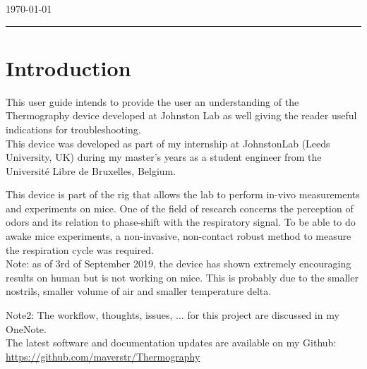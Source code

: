 \documentclass[a4paper]{article}
\begin{document}
\begin{titlepage}

{\large \today}\\[2cm] %


\vfill %

\end{titlepage}


\noindent\rule{\textwidth}{1pt}

\tableofcontents

\newpage

\listoffigures


\newpage


\section{Introduction}
This user guide intends to provide the user an understanding of the Thermography device developed at Johnston Lab as well giving the reader useful indications for troubleshooting.\\

This device was developed as part of my internship at JohnstonLab (Leeds University, UK) during my master's years as a student engineer from the Université Libre de Bruxelles, Belgium.

This device is part of the rig that allows the lab to perform in-vivo measurements and experiments on mice. One of the field of research concerns the perception of odors and its relation to phase-shift with the respiratory signal. To be able to do awake mice experiments, a non-invasive, non-contact robust method to measure the respiration cycle was required.\\

Note: as of 3rd of September 2019, the device has shown extremely encouraging results on human but is not working on mice. This is probably due to the smaller nostrils, smaller volume of air and smaller temperature delta.

Note2: The workflow, thoughts, issues, ... for this project are discussed in my OneNote.\\

The latest software and documentation updates are available on my Github: \url{https://github.com/maverstr/Thermography}
\end{document}
